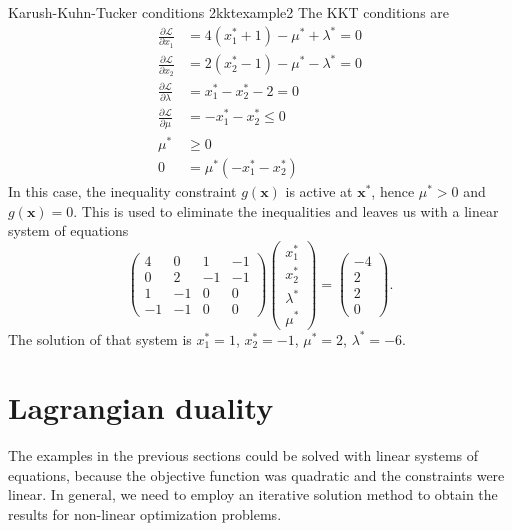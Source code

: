 \begin{example}{Karush-Kuhn-Tucker conditions 2}{kktexample2}
    The KKT conditions are 
    \begin{align}
        \frac{\partial \mathcal{\mathcal{L}}}{\partial x_1} &= 4 (x_1^* + 1) - \mu^* + \lambda^*  = 0\\
        \frac{\partial \mathcal{\mathcal{L}}}{\partial x_2} &= 2 (x_2^* - 1) - \mu^* - \lambda^*  = 0\\
        \frac{\partial \mathcal{\mathcal{L}}}{\partial \lambda} &= x_1^* - x_2^* - 2 = 0 \\
        \label{eq:kkt_example2_in}
        \frac{\partial \mathcal{\mathcal{L}}}{\partial \mu} &= -x_1^*-x_2^* \le 0 \\
        \mu^* &\ge 0 \\
        0 &= \mu^*(-x_1^*-x_2^*)
        \label{eq:kkt_example2_comp}
    \end{align}
    In this case, the inequality constraint $g(\mathbf{x})$ is active at $\mathbf{x}^*$, hence $\mu^* > 0$ and $g(\mathbf{x})=0$. This is used to eliminate the inequalities and leaves us with a linear system of equations 
    \begin{equation}
        \begin{pmatrix}
        4  & 0  & 1 & -1  \\
        0  & 2  & -1 & -1 \\ 
        1  & -1 & 0  & 0  \\
        -1 & -1 & 0  & 0
        \end{pmatrix} 
        \begin{pmatrix}
        x_1^* \\ x_2^* \\ \lambda^* \\ \mu^*  
        \end{pmatrix} 
        = 
        \begin{pmatrix}
        -4 \\ 2 \\ 2\\ 0
        \end{pmatrix} 
        .
    \end{equation}
    The solution of that system is $x_1^*=1$, $x_2^*=-1$, $\mu^*=2$, $\lambda^*=-6$.
\end{example}

\section{Lagrangian duality}
The examples in the previous sections could be solved with linear systems of equations, because the objective function was quadratic and the constraints were linear. In general, we need to employ an iterative solution method to obtain the results for non-linear optimization problems. 

